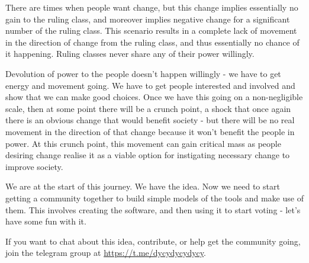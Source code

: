 \documentclass[twoside]{article}
\begin{document}
There are times when people want change, but this change implies essentially no gain to the ruling class, and moreover implies negative change for a significant number of the ruling class. This scenario results in a complete lack of movement in the direction of change from the ruling class, and thus essentially no chance of it happening. Ruling classes never share any of their power willingly.

Devolution of power to the people doesn’t happen willingly - we have to get energy and movement going. We have to get people interested and involved and show that we can make good choices. Once we have this going on a non-negligible scale, then at some point there will be a crunch point, a shock that once again there is an obvious change that would benefit society - but there will be no real movement in the direction of that change because it won’t benefit the people in power. At this crunch point, this movement can gain critical mass as people desiring change realise it as a viable option for instigating necessary change to improve society.

We are at the start of this journey. We have the idea. Now we need to start getting a community together to build simple models of the tools and make use of them. This involves creating the software, and then using it to start voting - let’s have some fun with it.

If you want to chat about this idea, contribute, or help get the community going, join the telegram group at \url{https://t.me/dycydycydycy}.
	
	
	
\end{document}
